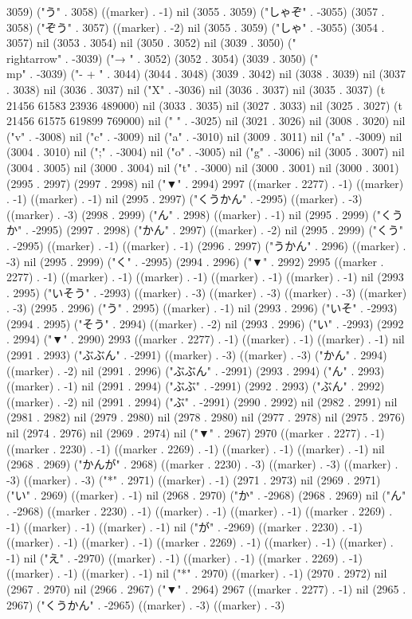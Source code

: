 3059) ("う" . 3058) ((marker) . -1) nil (3055 . 3059) ("しゃぞ" . -3055) (3057 . 3058) ("ぞう" . 3057) ((marker) . -2) nil (3055 . 3059) ("しゃ" . -3055) (3054 . 3057) nil (3053 . 3054) nil (3050 . 3052) nil (3039 . 3050) ("\\rightarrow" . -3039) ("→
" . 3052) (3052 . 3054) (3039 . 3050) ("\\mp" . -3039) ("-
+
" . 3044) (3044 . 3048) (3039 . 3042) nil (3038 . 3039) nil (3037 . 3038) nil (3036 . 3037) nil ("X" . -3036) nil (3036 . 3037) nil (3035 . 3037) (t 21456 61583 23936 489000) nil (3033 . 3035) nil (3027 . 3033) nil (3025 . 3027) (t 21456 61575 619899 769000) nil (" " . -3025) nil (3021 . 3026) nil (3008 . 3020) nil ("v" . -3008) nil ("c" . -3009) nil ("a" . -3010) nil (3009 . 3011) nil ("a" . -3009) nil (3004 . 3010) nil (";" . -3004) nil ("o" . -3005) nil ("g" . -3006) nil (3005 . 3007) nil (3004 . 3005) nil (3000 . 3004) nil ("t" . -3000) nil (3000 . 3001) nil (3000 . 3001) (2995 . 2997) (2997 . 2998) nil ("▼" . 2994) 2997 ((marker . 2277) . -1) ((marker) . -1) ((marker) . -1) nil (2995 . 2997) ("くうかん" . -2995) ((marker) . -3) ((marker) . -3) (2998 . 2999) ("ん" . 2998) ((marker) . -1) nil (2995 . 2999) ("くうか" . -2995) (2997 . 2998) ("かん" . 2997) ((marker) . -2) nil (2995 . 2999) ("くう" . -2995) ((marker) . -1) ((marker) . -1) (2996 . 2997) ("うかん" . 2996) ((marker) . -3) nil (2995 . 2999) ("く" . -2995) (2994 . 2996) ("▼" . 2992) 2995 ((marker . 2277) . -1) ((marker) . -1) ((marker) . -1) ((marker) . -1) ((marker) . -1) nil (2993 . 2995) ("いそう" . -2993) ((marker) . -3) ((marker) . -3) ((marker) . -3) ((marker) . -3) (2995 . 2996) ("う" . 2995) ((marker) . -1) nil (2993 . 2996) ("いそ" . -2993) (2994 . 2995) ("そう" . 2994) ((marker) . -2) nil (2993 . 2996) ("い" . -2993) (2992 . 2994) ("▼" . 2990) 2993 ((marker . 2277) . -1) ((marker) . -1) ((marker) . -1) nil (2991 . 2993) ("ぶぶん" . -2991) ((marker) . -3) ((marker) . -3) ("かん" . 2994) ((marker) . -2) nil (2991 . 2996) ("ぶぶん" . -2991) (2993 . 2994) ("ん" . 2993) ((marker) . -1) nil (2991 . 2994) ("ぶぶ" . -2991) (2992 . 2993) ("ぶん" . 2992) ((marker) . -2) nil (2991 . 2994) ("ぶ" . -2991) (2990 . 2992) nil (2982 . 2991) nil (2981 . 2982) nil (2979 . 2980) nil (2978 . 2980) nil (2977 . 2978) nil (2975 . 2976) nil (2974 . 2976) nil (2969 . 2974) nil ("▼" . 2967) 2970 ((marker . 2277) . -1) ((marker . 2230) . -1) ((marker . 2269) . -1) ((marker) . -1) ((marker) . -1) nil (2968 . 2969) ("かんが" . 2968) ((marker . 2230) . -3) ((marker) . -3) ((marker) . -3) ((marker) . -3) ("*" . 2971) ((marker) . -1) (2971 . 2973) nil (2969 . 2971) ("い" . 2969) ((marker) . -1) nil (2968 . 2970) ("か" . -2968) (2968 . 2969) nil ("ん" . -2968) ((marker . 2230) . -1) ((marker) . -1) ((marker) . -1) ((marker . 2269) . -1) ((marker) . -1) ((marker) . -1) nil ("が" . -2969) ((marker . 2230) . -1) ((marker) . -1) ((marker) . -1) ((marker . 2269) . -1) ((marker) . -1) ((marker) . -1) nil ("え" . -2970) ((marker) . -1) ((marker) . -1) ((marker . 2269) . -1) ((marker) . -1) ((marker) . -1) nil ("*" . 2970) ((marker) . -1) (2970 . 2972) nil (2967 . 2970) nil (2966 . 2967) ("▼" . 2964) 2967 ((marker . 2277) . -1) nil (2965 . 2967) ("くうかん" . -2965) ((marker) . -3) ((marker) . -3) 